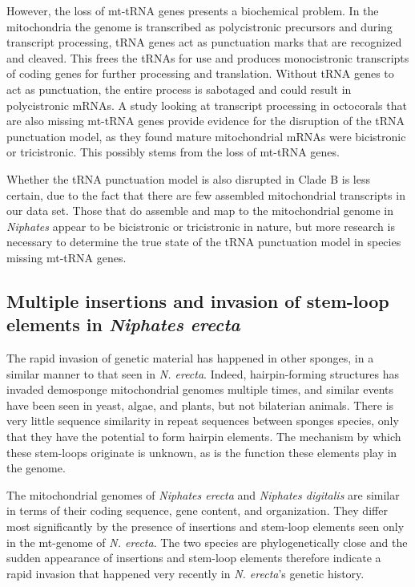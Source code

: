 \documentclass[../main.tex]{subfiles}
\begin{document}
However, the loss of mt-tRNA genes presents a biochemical problem. In the mitochondria the genome is transcribed as polycistronic precursors and during transcript processing, tRNA genes act as punctuation marks that are recognized and cleaved. This frees the tRNAs for use and produces monocistronic transcripts of coding genes for further processing and translation. Without tRNA genes to act as punctuation, the entire process is sabotaged and could result in polycistronic mRNAs. A study looking at transcript processing in octocorals that are also missing mt-tRNA genes provide evidence for the disruption of the tRNA punctuation model, as they found mature mitochondrial mRNAs were bicistronic or tricistronic. This possibly stems from the loss of mt-tRNA genes.

Whether the tRNA punctuation model is also disrupted in Clade B is less certain, due to the fact that there are few assembled mitochondrial transcripts in our data set. Those that do assemble and map to the mitochondrial genome in \emph{Niphates} appear to be bicistronic or tricistronic in nature, but more research is necessary to determine the true state of the tRNA punctuation model in species missing mt-tRNA genes.

\subsection{Multiple insertions and invasion of stem-loop elements in \emph{Niphates erecta}}

The rapid invasion of genetic material has happened in other sponges, in a similar manner to that seen in \emph{N. erecta}. Indeed, hairpin-forming structures has invaded demosponge mitochondrial genomes multiple times, and similar events have been seen in yeast, algae, and plants, but not bilaterian animals. There is very little sequence similarity in repeat sequences between sponges species, only that they have the potential to form hairpin elements. The mechanism by which these stem-loops originate is unknown, as is the function these elements play in the genome.

The mitochondrial genomes of \emph{Niphates erecta} and \emph{Niphates digitalis} are similar in terms of their coding sequence, gene content, and  organization. They differ most significantly by the presence of insertions and stem-loop elements seen only in the mt-genome of \emph{N. erecta}. The two species are phylogenetically close and the sudden appearance of insertions and stem-loop elements therefore indicate a rapid invasion that happened very recently in \emph{N. erecta}'s genetic history. 
\end{document}
